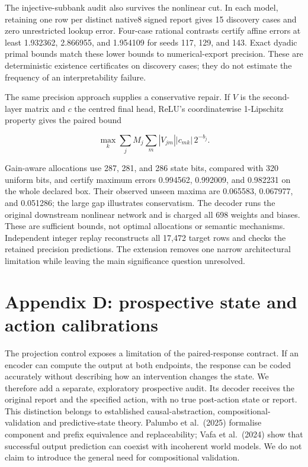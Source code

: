\documentclass[
  british,
  11pt,
  a4paper,
]{article}
\begin{document}
The injective-subbank audit also survives the nonlinear cut. In each
model, retaining one row per distinct native8 signed report gives 15
discovery cases and zero unrestricted lookup error. Four-case rational
contrasts certify affine errors at least 1.932362, 2.866955, and
1.954109 for seeds 117, 129, and 143. Exact dyadic primal bounds match
these lower bounds to numerical-export precision. These are
deterministic existence certificates on discovery cases; they do not
estimate the frequency of an interpretability failure.

The same precision approach supplies a conservative repair. If \(V\) is
the second-layer matrix and \(c\) the centred final head, ReLU's
coordinatewise 1-Lipschitz property gives the paired bound

\[\max_k\sum_j M_j\sum_m|V_{jm}||c_{mk}|\,2^{-b_j}.\]

Gain-aware allocations use 287, 281, and 286 state bits, compared with
320 uniform bits, and certify maximum errors 0.994562, 0.992009, and
0.982231 on the whole declared box. Their observed unseen maxima are
0.065583, 0.067977, and 0.051286; the large gap illustrates
conservatism. The decoder runs the original downstream nonlinear network
and is charged all 698 weights and biases. These are sufficient bounds,
not optimal allocations or semantic mechanisms. Independent integer
replay reconstructs all 17,472 target rows and checks the retained
precision predictions. The extension removes one narrow architectural
limitation while leaving the main significance question unresolved.

\section{Appendix D: prospective state and action
calibrations}\label{appendix-d-prospective-state-and-action-calibrations}

The projection control exposes a limitation of the paired-response
contract. If an encoder can compute the output at both endpoints, the
response can be coded accurately without describing how an intervention
changes the state. We therefore add a separate, exploratory prospective
audit. Its decoder receives the original report and the specified
action, with no true post-action state or report. This distinction
belongs to established causal-abstraction, compositional-validation and
predictive-state theory. Palumbo et al.~(2025) formalise component and
prefix equivalence and replaceability; Vafa et al.~(2024) show that
successful output prediction can coexist with incoherent world models.
We do not claim to introduce the general need for compositional
validation.
\end{document}
